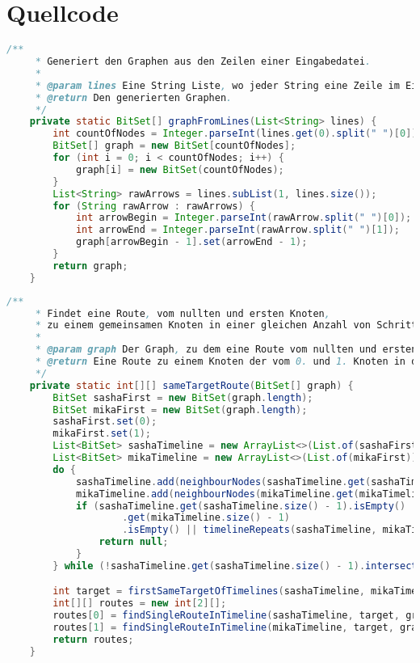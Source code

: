 \documentclass[a4paper,10pt,ngerman]{scrartcl}
\begin{document}
    \section{Quellcode}\label{sec:quellcode}\label{LastPage}
    \begin{lstlisting}[frame=single,language=Java,title=Methode graphFromLines,breaklines=true]
    /**
     * Generiert den Graphen aus den Zeilen einer Eingabedatei.
     *
     * @param lines Eine String Liste, wo jeder String eine Zeile im Eingabeformat ist.
     * @return Den generierten Graphen.
     */
    private static BitSet[] graphFromLines(List<String> lines) {
        int countOfNodes = Integer.parseInt(lines.get(0).split(" ")[0]);
        BitSet[] graph = new BitSet[countOfNodes];
        for (int i = 0; i < countOfNodes; i++) {
            graph[i] = new BitSet(countOfNodes);
        }
        List<String> rawArrows = lines.subList(1, lines.size());
        for (String rawArrow : rawArrows) {
            int arrowBegin = Integer.parseInt(rawArrow.split(" ")[0]);
            int arrowEnd = Integer.parseInt(rawArrow.split(" ")[1]);
            graph[arrowBegin - 1].set(arrowEnd - 1);
        }
        return graph;
    }
	\end{lstlisting}
	
	
	\begin{lstlisting}[frame=single,language=Java,title=Methode sameTargetRoute,breaklines=true]
    /**
     * Findet eine Route, vom nullten und ersten Knoten,
     * zu einem gemeinsamen Knoten in einer gleichen Anzahl von Schritten.
     *
     * @param graph Der Graph, zu dem eine Route vom nullten und ersten Knoten zu einem gemeinsamen Knoten gebildet werden soll.
     * @return Eine Route zu einem Knoten der vom 0. und 1. Knoten in der gleichen Anzahl von Schritten erreichbar ist.
     */
    private static int[][] sameTargetRoute(BitSet[] graph) {
        BitSet sashaFirst = new BitSet(graph.length);
        BitSet mikaFirst = new BitSet(graph.length);
        sashaFirst.set(0);
        mikaFirst.set(1);
        List<BitSet> sashaTimeline = new ArrayList<>(List.of(sashaFirst));
        List<BitSet> mikaTimeline = new ArrayList<>(List.of(mikaFirst));
        do {
            sashaTimeline.add(neighbourNodes(sashaTimeline.get(sashaTimeline.size() - 1), graph));
            mikaTimeline.add(neighbourNodes(mikaTimeline.get(mikaTimeline.size() - 1), graph));
            if (sashaTimeline.get(sashaTimeline.size() - 1).isEmpty() || mikaTimeline
                    .get(mikaTimeline.size() - 1)
                    .isEmpty() || timelineRepeats(sashaTimeline, mikaTimeline)) {
                return null;
            }
        } while (!sashaTimeline.get(sashaTimeline.size() - 1).intersects(mikaTimeline.get(mikaTimeline.size() - 1)));

        int target = firstSameTargetOfTimelines(sashaTimeline, mikaTimeline);
        int[][] routes = new int[2][];
        routes[0] = findSingleRouteInTimeline(sashaTimeline, target, graph);
        routes[1] = findSingleRouteInTimeline(mikaTimeline, target, graph);
        return routes;
    }
	\end{lstlisting}
	
\end{document}
